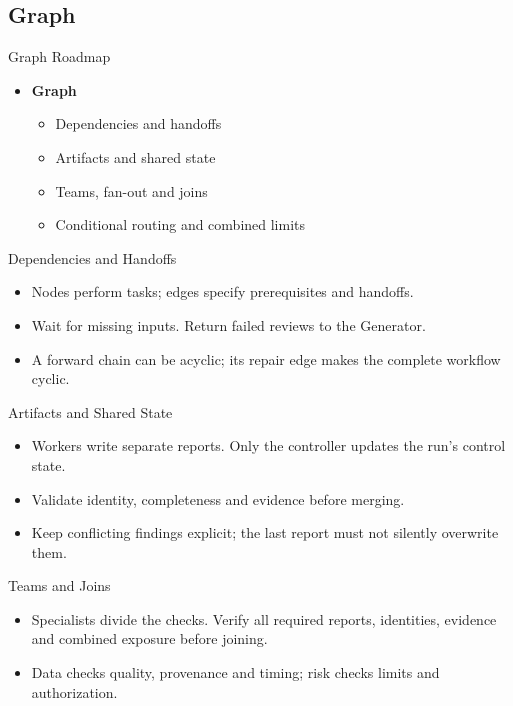 \subsection{Graph}
\begin{frame}{Graph Roadmap}
\begin{itemize}
\item \textbf{Graph}
\begin{itemize}
\item Dependencies and handoffs
\item Artifacts and shared state
\item Teams, fan-out and joins
\item Conditional routing and combined limits
\end{itemize}
\end{itemize}
\end{frame}
\begin{frame}{Dependencies and Handoffs}
\begin{center}\resizebox{.94\textwidth}{!}{}\end{center}
\begin{itemize}
\item Nodes perform tasks; edges specify prerequisites and handoffs.
\item Wait for missing inputs. Return failed reviews to the Generator.
\item A forward chain can be acyclic; its repair edge makes the complete workflow cyclic.
\end{itemize}
\end{frame}
\begin{frame}{Artifacts and Shared State}
\begin{center}\resizebox{.96\textwidth}{!}{}\end{center}
\begin{itemize}
\item Workers write separate reports. Only the controller updates the run's control state.
\item Validate identity, completeness and evidence before merging.
\item Keep conflicting findings explicit; the last report must not silently overwrite them.
\end{itemize}
\end{frame}
\begin{frame}{Teams and Joins}
\setlength{\topsep}{0pt}
\begin{center}\resizebox{.86\textwidth}{!}{}\end{center}
\begin{itemize}
\item Specialists divide the checks. Verify all required reports, identities, evidence and combined exposure before joining.
\item Data checks quality, provenance and timing; risk checks limits and authorization.
\end{itemize}
\end{frame}
